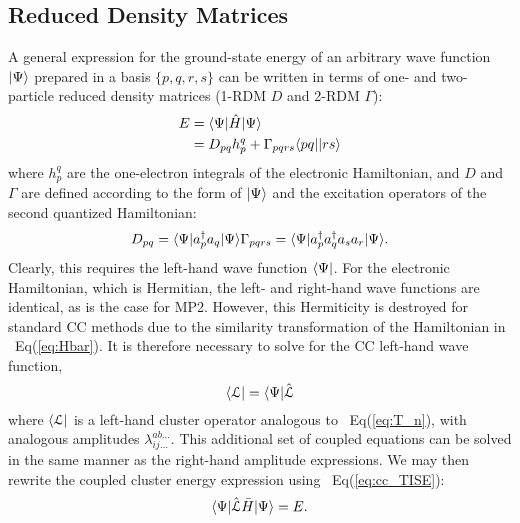 \subsection{Reduced Density Matrices} \label{ss:rdm} A general expression
for the ground-state energy of an arbitrary wave function $| \Psi \rangle$
prepared in a basis $\{p,q,r,s\}$ can be written in terms of one- and
two-particle reduced density matrices (1-RDM $D$ and 2-RDM $\Gamma$):
\cite{Harris1992,Trucks1988}
\begin{equation} \label{eq:pdm_e}
    \begin{aligned} E & = \langle\Psi |\hat{H}| \Psi \rangle \\
      & = D_{pq}h_{p}^{q} + \Gamma_{pqrs}\langle pq || rs \rangle
    \end{aligned}
\end{equation} where $h_{p}^{q}$ are the one-electron integrals of the
electronic Hamiltonian, and $D$ and $\Gamma$ are defined according to the
form of $| \Psi \rangle$ and the excitation operators of the second quantized
Hamiltonian: \begin{subequations} \begin{equation} \label{eq:opdm}
    D_{pq} = \bra{\Psi}a_p^{\dagger}a_q\ket{\Psi}
\end{equation} \begin{equation} \label{eq:tpdm}
    \Gamma_{pqrs} = \bra{\Psi}a_p^{\dagger}a_q^{\dagger}a_sa_r\ket{\Psi}.
\end{equation} \end{subequations} 
Clearly, this requires the
left-hand wave function $\langle\Psi |$. For the electronic Hamiltonian,
which is Hermitian, the left- and right-hand wave functions are identical,
as is the case for MP2. However, this Hermiticity is destroyed for standard
CC methods due to the similarity transformation of the Hamiltonian in
~Eq(\ref{eq:Hbar}).\cite{Crawford2000} It is therefore necessary to solve for the CC left-hand
wave function, \begin{equation} \label{eq:cc_lwfn}
    \langle\mathcal{L} | = \langle\Psi |\hat{\mathcal{L}}
\end{equation} where $\langle\mathcal{L} |$ is a left-hand cluster
operator analogous to ~Eq(\ref{eq:T_n}), with analogous amplitudes
$\lambda_{ij\ldots}^{ab\ldots}$. This additional set of coupled
equations can be solved in the same manner as the right-hand amplitude
expressions. We may then rewrite the coupled cluster energy expression
using ~Eq(\ref{eq:cc_TISE}): \begin{equation} \label{eq:cc_energy_total}
    \langle\Psi |\hat{\mathcal{L}}\bar{H}| \Psi \rangle = E.
\end{equation}

